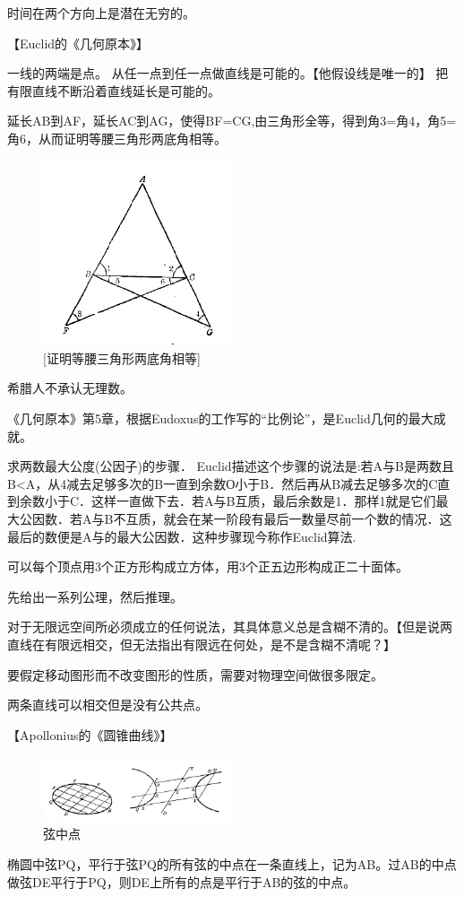 时间在两个方向上是潜在无穷的。


【Euclid的《几何原本》】

一线的两端是点。
从任一点到任一点做直线是可能的。【他假设线是唯一的】
把有限直线不断沿着直线延长是可能的。


延长AB到AF，延长AC到AG，使得BF=CG,由三角形全等，得到角3=角4，角5=角6，从而证明等腰三角形两底角相等。
\begin{figure}[h]
    \centering
    \includegraphics[width=0.5\textwidth]{./resources/古今数学思想-图4_2.png}
    \caption{[证明等腰三角形两底角相等]}
    \label{fig:6}
\end{figure}

希腊人不承认无理数。

《几何原本》第5章，根据Eudoxus的工作写的“比例论”，是Euclid几何的最大成就。


求两数最大公度(公因子)的步骤． Euclid描述这个步骤的说法是:若A与B是两数且B<A，从4减去足够多次的B一直到余数О小于B．然后再从B减去足够多次的C直到余数小于C．这样一直做下去．若A与B互质，最后余数是1．那样1就是它们最大公因数．若A与B不互质，就会在某一阶段有最后一数量尽前一个数的情况．这最后的数便是A与的最大公因数．这种步骤现今称作Euclid算法.

可以每个顶点用3个正方形构成立方体，用3个正五边形构成正二十面体。

先给出一系列公理，然后推理。

对于无限远空间所必须成立的任何说法，其具体意义总是含糊不清的。【但是说两直线在有限远相交，但无法指出有限远在何处，是不是含糊不清呢？】

要假定移动图形而不改变图形的性质，需要对物理空间做很多限定。

两条直线可以相交但是没有公共点。




【Apollonius的《圆锥曲线》】



\begin{figure}[h]
    \centering
    \includegraphics[width=0.5\textwidth]{./resources/古今数学思想-图4_21.png}
    \caption{弦中点}
    \label{fig:7}
\end{figure}
椭圆中弦PQ，平行于弦PQ的所有弦的中点在一条直线上，记为AB。过AB的中点做弦DE平行于PQ，则DE上所有的点是平行于AB的弦的中点。


